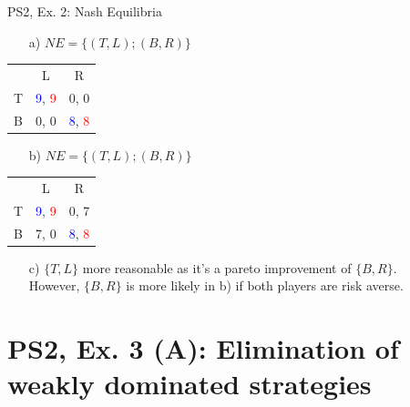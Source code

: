 \begin{frame}{PS2, Ex. 2: Nash Equilibria}
  \begin{itemize}
    \item[a)] $NE=\{(T,L);(B,R)\}$
  \end{itemize}
  \begin{table}
    \begin{tabular}{c|c|c|}
        \multicolumn{1}{c}{} & \multicolumn{1}{c}{L}  & \multicolumn{1}{c}{R} \\\cline{2-3}
        T & \textcolor{blue}{9}, \textcolor{red}{9} & 0, 0 \\\cline{2-3}
        B & 0, 0 & \textcolor{blue}{8}, \textcolor{red}{8} \\\cline{2-3}
    \end{tabular}
  \end{table}
  \begin{itemize}
    \item[b)] $NE=\{(T,L);(B,R)\}$
  \end{itemize}
  \begin{table}
    \begin{tabular}{c|c|c|}
        \multicolumn{1}{c}{} & \multicolumn{1}{c}{L}  & \multicolumn{1}{c}{R} \\\cline{2-3}
        T & \textcolor{blue}{9}, \textcolor{red}{9} & 0, 7 \\\cline{2-3}
        B & 7, 0 & \textcolor{blue}{8}, \textcolor{red}{8} \\\cline{2-3}
    \end{tabular}
  \end{table}
  \begin{itemize}
    \item[c)] $\{T, L\}$ more reasonable as it's a pareto improvement of $\{B, R\}$.\\
    However, $\{B, R\}$ is more likely in b) if both players are risk averse.
  \end{itemize}
\end{frame}


\section{PS2, Ex. 3 (A): Elimination of weakly dominated strategies}


